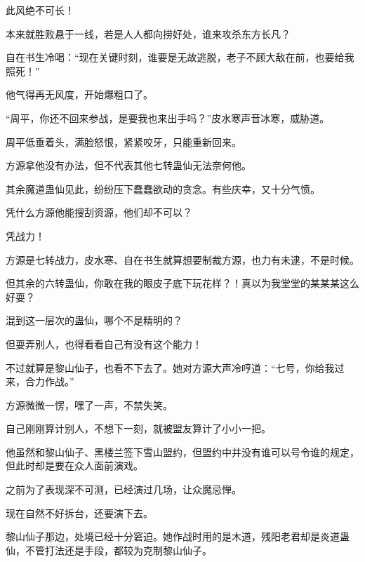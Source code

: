\begin{this_body}
此风绝不可长！

本来就胜败悬于一线，若是人人都向捞好处，谁来攻杀东方长凡？

自在书生冷喝：“现在关键时刻，谁要是无故逃脱，老子不顾大敌在前，也要给我照死！”

他气得再无风度，开始爆粗口了。

“周平，你还不回来参战，是要我也来出手吗？”皮水寒声音冰寒，威胁道。

周平低垂着头，满脸怒恨，紧紧咬牙，只能重新回来。

方源拿他没有办法，但不代表其他七转蛊仙无法奈何他。

其余魔道蛊仙见此，纷纷压下蠢蠢欲动的贪念。有些庆幸，又十分气愤。

凭什么方源他能搜刮资源，他们却不可以？

凭战力！

方源是七转战力，皮水寒、自在书生就算想要制裁方源，也力有未逮，不是时候。

但其余的六转蛊仙，你敢在我的眼皮子底下玩花样？！真以为我堂堂的某某某这么好耍？

混到这一层次的蛊仙，哪个不是精明的？

但耍弄别人，也得看看自己有没有这个能力！

不过就算是黎山仙子，也看不下去了。她对方源大声冷哼道：“七号，你给我过来，合力作战。”

方源微微一愣，嘿了一声，不禁失笑。

自己刚刚算计别人，不想下一刻，就被盟友算计了小小一把。

他虽然和黎山仙子、黑楼兰签下雪山盟约，但盟约中并没有谁可以号令谁的规定，但此时却是要在众人面前演戏。

之前为了表现深不可测，已经演过几场，让众魔忌惮。

现在自然不好拆台，还要演下去。

黎山仙子那边，处境已经十分窘迫。她作战时用的是木道，残阳老君却是炎道蛊仙，不管打法还是手段，都较为克制黎山仙子。

\end{this_body}

